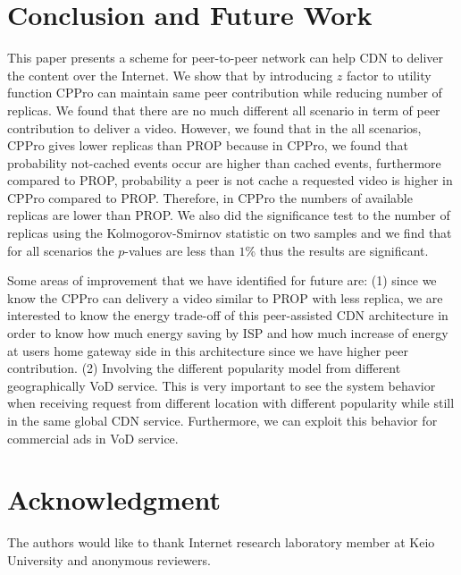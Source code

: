 \documentclass[10pt,final,journal,a4paper]{IEEEtran}
\begin{document}
\section{Conclusion and Future Work}\label{conclusion}
This paper presents a scheme for peer-to-peer network can help CDN to deliver the content over the Internet. 
We show that by introducing $z$ factor to utility function CPPro can maintain same peer contribution while reducing number of replicas.
We found that there are no much different all scenario in term of peer contribution to deliver a video. 
However, we found that in the all scenarios, CPPro gives lower replicas than PROP because in CPPro, we found that probability not-cached events occur are higher than cached events, furthermore compared to PROP, probability a peer is not cache a requested video is higher in CPPro compared to PROP.
Therefore, in CPPro the numbers of available replicas are lower than PROP. 
We also did the significance test to the number of replicas using the Kolmogorov-Smirnov statistic on two samples and we find that for all scenarios the $p$-values are less than $1$\% thus the results are significant. 

Some areas of improvement that we have identified for future are: (1) since we know the CPPro can delivery a video similar to PROP with less replica, we are interested to know the energy trade-off of this peer-assisted CDN architecture in order to know how much energy saving by ISP and how much increase of energy at users home gateway side in this architecture since we have higher peer contribution.   
(2) Involving the different popularity model from different geographically VoD service.
This is very important to see the system behavior when receiving request from different location with different popularity while still in the same global CDN service. 
Furthermore, we can exploit this behavior for commercial ads in VoD service.


\section*{Acknowledgment}
The authors would like to thank Internet research laboratory member at Keio University and anonymous reviewers.




\end{document}

